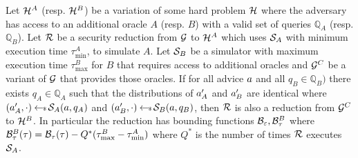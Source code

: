 




\begin{lemma}
  \label{oracle-sub}
  Let $\mathcal{H}^A$ (resp. $\mathcal{H}^B$) be a variation of some hard problem $\mathcal{H}$ where the adversary has access to an additional oracle $A$ (resp. $B$) with a valid set of queries $\mathbb{Q}_A$ (resp. $\mathbb{Q}_B$).
  Let $\mathcal{R}$ be a security reduction from  $\mathcal{G}$ to $\mathcal{H}^A$ which uses $\mathcal{S}_A$ with minimum execution time $\tau^A_{\min}$, to simulate $A$.
  Let $\mathcal{S}_B$ be a simulator with maximum execution time $\tau^B_{\max}$ for $B$ that requires access to additional oracles and $\mathcal{G}^C$ be a variant of $\mathcal{G}$ that provides those oracles.
  If for all advice $a$ and all $q_B \in \mathbb{Q}_B)$ there exists $q_A \in \mathbb{Q}_A$ such that the distributions of $a'_A$ and $a'_B$ are identical where $(a'_A, \cdot) \hskip2.3pt{\gets\!\!\mbox{\tiny${\$}$\normalsize}}\, \mathcal{S}_A(a, q_A)$ and $(a'_B, \cdot) \hskip2.3pt{\gets\!\!\mbox{\tiny${\$}$\normalsize}}\, \mathcal{S}_B(a, q_B)$,
  then $\mathcal{R}$ is also a reduction from $\mathcal{G}^C$ to $\mathcal{H}^B$.
  In particular the reduction has bounding functions $\mathcal{B}_\varepsilon, \mathcal{B}^B_\tau$ where $\mathcal{B}^B_\tau(\tau) = \mathcal{B}_\tau(\tau) - Q^*(\tau^B_{\max} - \tau^A_{\min})$ where $Q^*$ is the number of times $\mathcal{R}$ executes $\mathcal{S}_A$.
\end{lemma}

